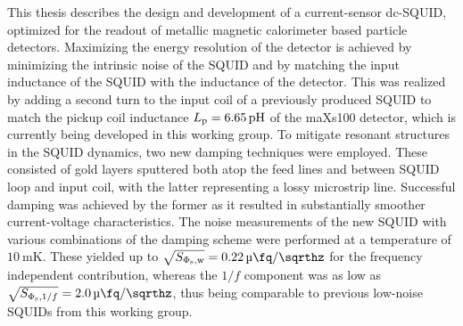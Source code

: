 \noindent
This thesis describes the design and development of a current-sensor dc-SQUID, optimized for the readout of metallic magnetic calorimeter based particle detectors. Maximizing the energy resolution of the detector is achieved by minimizing the intrinsic noise of the SQUID and by matching the input inductance of the SQUID with the inductance of the detector. This was realized by adding a second turn to the input coil of a previously produced SQUID to match the pickup coil inductance $L_{\rm p}=\qty{6.65}{\pH}$ of the maXs100 detector, which is currently being developed in this working group. To mitigate resonant structures in the SQUID dynamics, two new damping techniques were employed. These consisted of gold layers sputtered both atop the feed lines and between SQUID loop and input coil, with the latter representing a lossy microstrip line. Successful damping was achieved by the former as it resulted in substantially smoother current-voltage characteristics. The noise measurements of the new SQUID with various combinations of the damping scheme were performed at a temperature of $\qty{10}{\milli\kelvin}$. These yielded up to $\sqrt{S_{\Phi_{\rm s}, \rm w}}=\qty{0.22}{\micro\fq\per\sqrthz}$ for the frequency independent contribution, whereas the $1/f$ component was as low as $\sqrt{S_{\Phi_{\rm s}, 1/f}}=\qty{2.0}{\micro\fq\per\sqrthz}$, thus being comparable to previous low-noise SQUIDs from this working group. %



